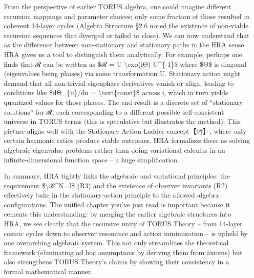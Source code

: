 \documentclass[]{article}
\begin{document}
From the perspective of earlier TORUS algebra, one could imagine
different recursion mappings and parameter choices; only some fraction
of those resulted in coherent 14-layer cycles (Algebra Structure §2.6
noted the existence of non-viable recursion sequences that diverged or
failed to close). We can now understand that as the difference between
non-stationary and stationary paths in the HRA sense. HRA gives us a
tool to distinguish them analytically. For example, perhaps one finds
that ℛ can be written as \$ℛ = U \textbackslash{}exp(iΘ) U\^{}\{-1\}\$
where \$Θ\$ is diagonal (eigenvalues being phases) via some
transformation U. Stationary action might demand that all non-trivial
eigenphase derivatives vanish or align, leading to conditions like
\$dΘ\_\{ii\}/dn = \textbackslash{}text\{const\}\$ across i, which in
turn yields quantized values for those phases. The end result is a
discrete set of ``stationary solutions'' for ℛ, each corresponding to a
different possible self-consistent universe in TORUS terms (this is
speculative but illustrates the method). This picture aligns well with
the Stationary-Action Ladder concept【9†】, where only certain harmonic
ratios produce stable outcomes. HRA formalizes these as solving
algebraic eigenvalue problems rather than doing variational calculus in
an infinite-dimensional function space -- a huge simplification.

In summary, HRA tightly links the algebraic and variational principles:
the requirement \$\textbackslash{}ℛ\^{}N=I\$ (R3) and the existence of
observer invariants (R2) effectively bake in the stationary-action
principle to the allowed algebra configurations. The unified chapter
you've just read is important because it cements this understanding: by
merging the earlier algebraic structures into HRA, we see clearly that
the recursive unity of TORUS Theory -- from 14-layer cosmic cycles down
to observer resonance and action minimization -- is upheld by one
overarching algebraic system. This not only streamlines the theoretical
framework (eliminating ad hoc assumptions by deriving them from axioms)
but also strengthens TORUS Theory's claims by showing their consistency
in a formal mathematical manner.
\end{document}
